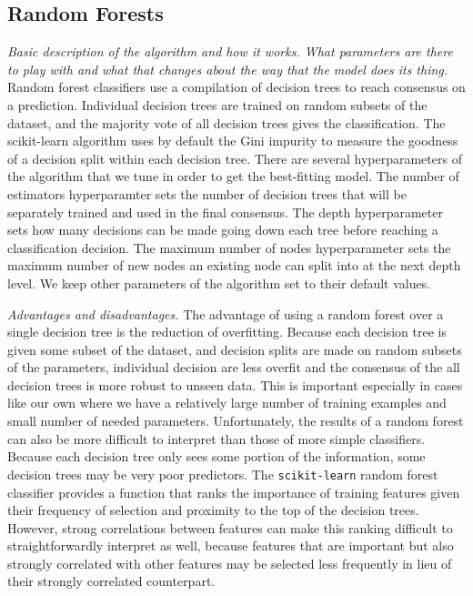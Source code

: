 \documentclass[fleqn,usenatbib]{mnras}
\begin{document}
\subsection{Random Forests}
\label{sec:rf} %
\textit{Basic description of the algorithm and how it works. What parameters are there to play with and what that changes about the way that the model does its thing.} Random forest classifiers use a compilation of decision trees to reach consensus on a prediction. Individual decision trees are trained on random subsets of the dataset, and the majority vote of all decision trees gives the classification. The scikit-learn algorithm uses by default the Gini impurity to measure the goodness of a decision split within each decision tree. There are several hyperparameters of the algorithm that we tune in order to get the best-fitting model. The number of estimators hyperparamter sets the number of decision trees that will be separately trained and used in the final consensus. The depth hyperparameter sets how many decisions can be made going down each tree before reaching a classification decision. The maximum number of nodes hyperparameter sets the maximum number of new nodes an existing node can split into at the next depth level. We keep other parameters of the algorithm set to their default values.

\textit{Advantages and disadvantages.} The advantage of using a random forest over a single decision tree is the reduction of overfitting. Because each decision tree is given some subset of the dataset, and decision splits are made on random subsets of the parameters, individual decision are less overfit and the consensus of the all decision trees is more robust to unseen data. This is important especially in cases like our own where we have a relatively large number of training examples and small number of needed parameters. Unfortunately, the results of a random forest can also be more difficult to interpret than those of more simple classifiers. Because each decision tree only sees some portion of the information, some decision trees may be very poor predictors. The \texttt{scikit-learn} random forest classifier provides a function that ranks the importance of training features given their frequency of selection and proximity to the top of the decision trees. However, strong correlations between features can make this ranking difficult to straightforwardly interpret as well, because features that are important but also strongly correlated with other features may be selected less frequently in lieu of their strongly correlated counterpart.
\end{document}
